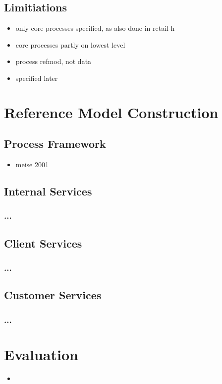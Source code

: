 \section{Limitiations}
\begin{itemize}
	\item only core processes specified, as also done in retail-h
	\item core processes partly on lowest level
	\item process refmod, not data
	\item specified later
\end{itemize}

\chapter{Reference Model Construction}
	\section{Process Framework}
	\begin{itemize}
		\item meise 2001
	\end{itemize}
	\section{Internal Services}
	\subsection{...}
	\section{Client Services}
	\subsection{...}
	\section{Customer Services}
	\subsection{...}
\chapter{Evaluation}
	\begin{itemize}
		\item 
	\end{itemize}
